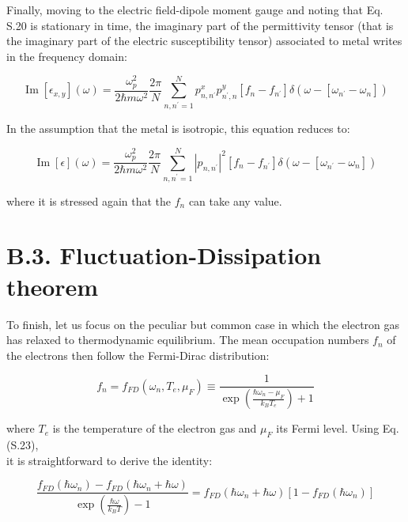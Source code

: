 \documentclass[10pt]{article}
\begin{document}
Finally, moving to the electric field-dipole moment gauge and noting that Eq. S.20 is stationary in time, the imaginary part of the permittivity tensor (that is the imaginary part of the electric susceptibility tensor) associated to metal writes in the frequency domain:


\begin{equation*}
\operatorname{Im}\left[\epsilon_{x, y}\right](\omega)=\frac{\omega_{p}^{2}}{2 \hbar m \omega^{2}} \frac{2 \pi}{N} \sum_{n, n^{\prime}=1}^{N} p_{n, n^{\prime}}^{x} p_{n^{\prime}, n}^{y}\left[f_{n}-f_{n^{\prime}}\right] \delta\left(\omega-\left[\omega_{n^{\prime}}-\omega_{n}\right]\right) \tag{S.21}
\end{equation*}


In the assumption that the metal is isotropic, this equation reduces to:


\begin{equation*}
\operatorname{Im}[\epsilon](\omega)=\frac{\omega_{p}^{2}}{2 \hbar m \omega^{2}} \frac{2 \pi}{N} \sum_{n, n^{\prime}=1}^{N}\left|p_{n, n^{\prime}}\right|^{2}\left[f_{n}-f_{n^{\prime}}\right] \delta\left(\omega-\left[\omega_{n^{\prime}}-\omega_{n}\right]\right) \tag{S.22}
\end{equation*}


where it is stressed again that the $f_{n}$ can take any value.

\section*{B.3. Fluctuation-Dissipation theorem}
To finish, let us focus on the peculiar but common case in which the electron gas has relaxed to thermodynamic equilibrium. The mean occupation numbers $f_{n}$ of the electrons then follow the Fermi-Dirac distribution:


\begin{equation*}
f_{n}=f_{F D}\left(\omega_{n}, T_{e}, \mu_{F}\right) \equiv \frac{1}{\exp \left(\frac{\hbar \omega_{n}-\mu_{F}}{k_{B} T_{e}}\right)+1} \tag{S.23}
\end{equation*}


where $T_{e}$ is the temperature of the electron gas and $\mu_{F}$ its Fermi level. Using Eq. (S.23),\\
it is straightforward to derive the identity:


\begin{equation*}
\frac{f_{F D}\left(\hbar \omega_{n}\right)-f_{F D}\left(\hbar \omega_{n}+\hbar \omega\right)}{\exp \left(\frac{\hbar \omega}{k_{B} T}\right)-1}=f_{F D}\left(\hbar \omega_{n}+\hbar \omega\right)\left[1-f_{F D}\left(\hbar \omega_{n}\right)\right] \tag{S.24}
\end{equation*}
\end{document}
